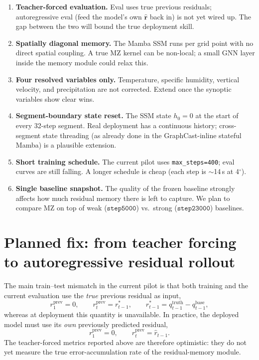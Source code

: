 \documentclass[11pt,a4paper]{article}
\begin{document}
\begin{enumerate}[nosep]
  \item \textbf{Teacher-forced evaluation.} Eval uses true previous residuals; autoregressive eval (feed the model's own $\widehat{\mathbf{r}}$ back in) is not yet wired up. The gap between the two will bound the true deployment skill.
  \item \textbf{Spatially diagonal memory.} The Mamba SSM runs per grid point with no direct spatial coupling. A true MZ kernel can be non-local; a small GNN layer inside the memory module could relax this.
  \item \textbf{Four resolved variables only.} Temperature, specific humidity, vertical velocity, and precipitation are not corrected. Extend once the synoptic variables show clear wins.
  \item \textbf{Segment-boundary state reset.} The SSM state $h_0 = 0$ at the start of every 32-step segment. Real deployment has a continuous history; cross-segment state threading (as already done in the GraphCast-inline stateful Mamba) is a plausible extension.
  \item \textbf{Short training schedule.} The current pilot uses \texttt{max\_steps=400}; eval curves are still falling. A longer schedule is cheap (each step is $\sim$14\,s at 4$^\circ$).
  \item \textbf{Single baseline snapshot.} The quality of the frozen baseline strongly affects how much residual memory there is left to capture. We plan to compare MZ on top of weak ($\texttt{step5000}$) vs.\ strong ($\texttt{step23000}$) baselines.
\end{enumerate}

\section{Planned fix: from teacher forcing to autoregressive residual rollout}

The main train--test mismatch in the current pilot is that both training and the current evaluation use the \emph{true} previous residual as input,
\begin{equation}
r^{\mathrm{prev}}_1 = 0,
\qquad
r^{\mathrm{prev}}_t = r^*_{t-1},
\qquad
r^*_{t-1} = q^{\mathrm{truth}}_{t-1} - q^{\mathrm{base}}_{t-1},
\end{equation}
whereas at deployment this quantity is unavailable. In practice, the deployed model must use its \emph{own} previously predicted residual,
\begin{equation}
r^{\mathrm{prev}}_1 = 0,
\qquad
r^{\mathrm{prev}}_t = \hat r_{t-1}.
\end{equation}
The teacher-forced metrics reported above are therefore optimistic: they do not yet measure the true error-accumulation rate of the residual-memory module.
\end{document}
